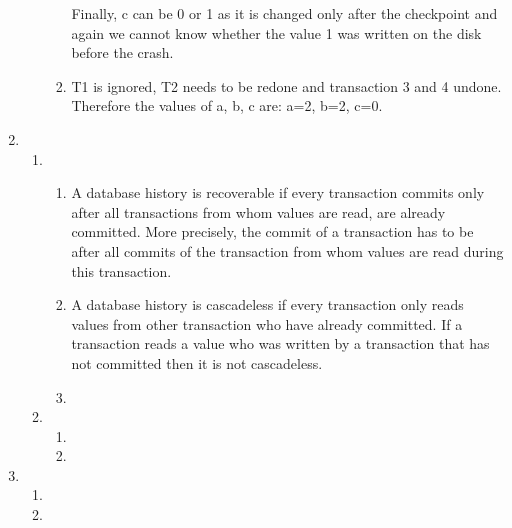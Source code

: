 \documentclass[12pt]{extarticle}
\begin{document}
\begin{flushleft}
\begin{enumerate}[label=\textbf{\Alph*.}]
\begin{enumerate}[label=\arabic*.]
\begin{enumerate}[label=(\alph*)]
Finally, c can be 0 or 1 as it is changed only after the checkpoint and again we cannot know whether the value 1 was written on the disk before the crash. 
\item T1 is ignored, T2 needs to be redone and transaction 3 and 4 undone. Therefore the values of a, b, c are: a=2, b=2, c=0. 
\end{enumerate}
\end{enumerate}
\item 
\begin{enumerate}[label=\arabic*.]
\item \begin{enumerate}[label=(\alph*)]
\item A database history is recoverable if every transaction commits only after all transactions from whom values are read, are already committed. More precisely, the commit of a transaction has to be after all commits of the transaction from whom values are read during this transaction. 
\item A database history is cascadeless if every transaction only reads values from other transaction who have already committed. If a transaction reads a value who was written by a transaction that has not committed then it is not cascadeless.
\item
\end{enumerate}
\item \begin{enumerate}[label=(\alph*)]
\item
\item
\end{enumerate}
\end{enumerate}
\item \begin{enumerate}[label=(\alph*)]
\item
\item
\end{enumerate}

\end{enumerate}
\end{flushleft}
\end{document}

